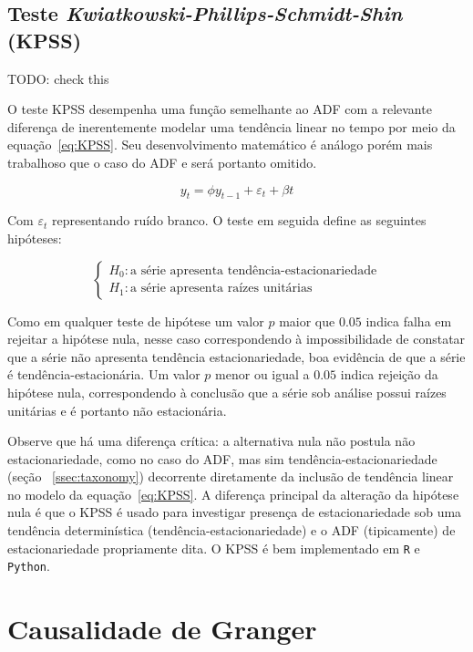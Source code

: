 \subsection{Teste \emph{Kwiatkowski-Phillips-Schmidt-Shin} (KPSS)}

TODO: check this

O teste KPSS desempenha uma função semelhante ao ADF com a relevante
diferença de inerentemente modelar uma tendência linear no tempo por meio da
equação~\ref{eq:KPSS}. Seu desenvolvimento matemático é análogo porém mais
trabalhoso que o caso do ADF e será portanto omitido.

\begin{equation}\label{eq:KPSS}
    y_t = \phi y_{t-1} + \varepsilon_t + \beta t
\end{equation}

Com $\varepsilon_t$ representando ruído branco. O teste em seguida define as
seguintes hipóteses:

$$
\begin{cases}
    H_0: \text{a série apresenta tendência-estacionariedade} \\
    H_1: \text{a série apresenta raízes unitárias}
\end{cases}
$$

Como em qualquer teste de hipótese um valor $p$ maior que $0.05$ indica falha
em rejeitar a hipótese nula, nesse caso correspondendo à impossibilidade de
constatar que a série não apresenta tendência estacionariedade, boa evidência
de que a série é tendência-estacionária. Um valor $p$ menor ou igual a $0.05$
indica rejeição da hipótese nula, correspondendo à conclusão que a série sob
análise possui raízes unitárias e é portanto não estacionária.

Observe que há uma diferença crítica: a alternativa nula não postula não
estacionariedade, como no caso do ADF, mas sim tendência-estacionariedade
(seção ~\ref{ssec:taxonomy}) decorrente diretamente da inclusão de tendência
linear no modelo da equação~\ref{eq:KPSS}. A diferença principal da alteração
da hipótese nula é que o KPSS é usado para investigar presença de
estacionariedade sob uma tendência determinística (tendência-estacionariedade)
e o ADF (tipicamente) de estacionariedade propriamente dita. O KPSS é bem
implementado em \verb+R+ e \verb+Python+.

\section{Causalidade de Granger}

